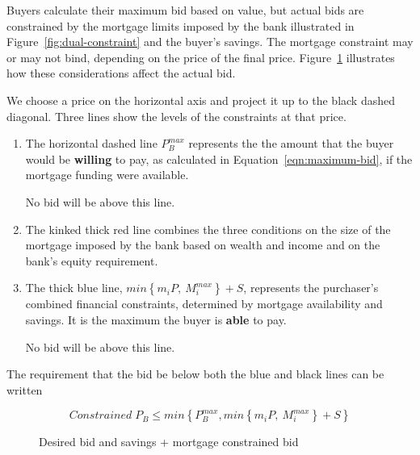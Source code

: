 {Buyers calculate their maximum bid based on value, but actual bids are constrained by the mortgage limits imposed by the bank illustrated in Figure~\ref{fig:dual-constraint} and the buyer's savings. The mortgage constraint may or may not bind, depending on the price of the final price. Figure~\ref{fig:savings-constraint} illustrates how these considerations affect the actual bid. 

We choose a price on the horizontal axis and project it up to the black dashed diagonal. Three lines show the levels of the constraints at that price.
\begin{enumerate}
    \item The horizontal dashed line $P_B^{max}$ represents the the amount that the  buyer would be  \textbf{willing} to pay, as calculated in Equation~\ref{eqn:maximum-bid}, if the mortgage funding were available. 

No bid will be above this line. 
    \item The kinked thick red line combines the three conditions on the size of the mortgage imposed by the bank based on wealth and income and on the bank's equity requirement.
   
    \item The thick blue line, $min\left\{m_i P,\  M_{i}^{max}\right\}+ S $, represents the purchaser's combined financial constraints, determined by mortgage availability and savings. It is the maximum the buyer is \textbf{able} to pay.  

No bid will be above this line. 
\end{enumerate}
The requirement that the bid be below both the blue and black lines  can be written

\begin{equation}
    Constrained\; P_{B} \le min \left\{P^{max}_B, min\left\{m_i P,\  M_{i}^{max}\right\}+ S \right\}  \label{eqn:bid_diagonal}
\end{equation}



 \begin{figure}
    \centering
    
    \caption{Desired bid  and savings + mortgage constrained bid}
    \label{fig:savings-constraint}
    \end{figure}
%

}
